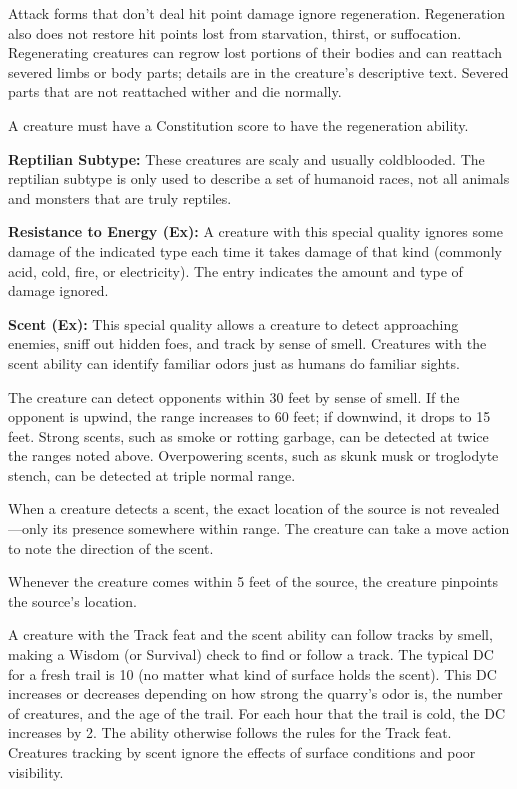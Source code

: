 \documentclass{article}
\begin{document}
Attack forms that don't deal hit point damage ignore regeneration. Regeneration 
also does not restore hit points lost from starvation, thirst, or suffocation. 
Regenerating creatures can regrow lost portions of their bodies and can reattach 
severed limbs or body parts; details are in the creature's descriptive text. Severed 
parts that are not reattached wither and die normally.

A creature must have a Constitution score to have the regeneration ability.

\vspace{12pt}
\textbf{Reptilian Subtype: }These creatures are scaly and usually coldblooded. 
The reptilian subtype is only used to describe a set of humanoid races, not all 
animals and monsters that are truly reptiles.

\vspace{12pt}
\textbf{Resistance to Energy (Ex):} A creature with this special quality ignores 
some damage of the indicated type each time it takes damage of that kind (commonly 
acid, cold, fire, or electricity). The entry indicates the amount and type of damage 
ignored.

\vspace{12pt}
\textbf{Scent (Ex):} This special quality allows a creature to detect approaching 
enemies, sniff out hidden foes, and track by sense of smell. Creatures with the 
scent ability can identify familiar odors just as humans do familiar sights.

The creature can detect opponents within 30 feet by sense of smell. If the opponent 
is upwind, the range increases to 60 feet; if downwind, it drops to 15 feet. Strong 
scents, such as smoke or rotting garbage, can be detected at twice the ranges noted 
above. Overpowering scents, such as skunk musk or troglodyte stench, can be detected 
at triple normal range.

When a creature detects a scent, the exact location of the source is not revealed---only 
its presence somewhere within range. The creature can take a move action to note 
the direction of the scent.

Whenever the creature comes within 5 feet of the source, the creature pinpoints 
the source's location.

A creature with the Track feat and the scent ability can follow tracks by smell, 
making a Wisdom (or Survival) check to find or follow a track. The typical DC for 
a fresh trail is 10 (no matter what kind of surface holds the scent). This DC increases 
or decreases depending on how strong the quarry's odor is, the number of creatures, 
and the age of the trail. For each hour that the trail is cold, the DC increases 
by 2. The ability otherwise follows the rules for the Track feat. Creatures tracking 
by scent ignore the effects of surface conditions and poor visibility. 
\end{document}
